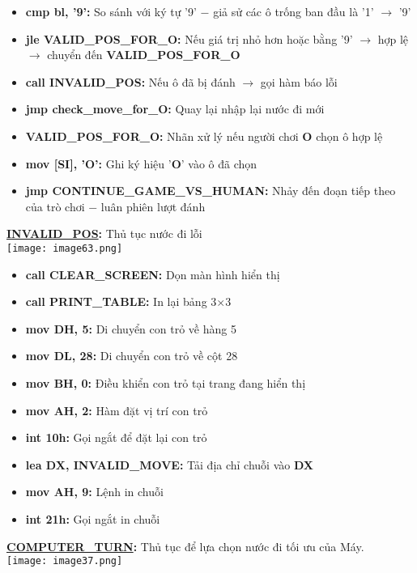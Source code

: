 \begin{itemize}
\begin{itemize}
        \item \textbf{cmp bl, '9': }So sánh với ký tự '9' $-$ giả sử các ô trống ban đầu là '1' $\rightarrow$ '9'
        \item \textbf{jle VALID\_POS\_FOR\_O:} Nếu giá trị nhỏ hơn hoặc bằng '9' $\rightarrow$ hợp lệ $\rightarrow$ chuyển đến \textbf{VALID\_POS\_FOR\_O}
        \item \textbf{call INVALID\_POS:} Nếu ô đã bị đánh $\rightarrow$ gọi hàm báo lỗi
        \item \textbf{jmp check\_move\_for\_O:} Quay lại nhập lại nước đi mới
        \item \textbf{VALID\_POS\_FOR\_O:} Nhãn xử lý nếu người chơi \textbf{O} chọn ô hợp lệ
        \item \textbf{mov [SI], 'O': }Ghi ký hiệu '\textbf{O}' vào ô đã chọn
        \item \textbf{jmp CONTINUE\_GAME\_VS\_HUMAN:} Nhảy đến đoạn tiếp theo của trò chơi $-$ luân phiên lượt đánh
    \end{itemize} 
\end{itemize}
\newpage
\textbf{\underline{INVALID\_POS}: }Thủ tục nước đi lỗi\\
\texttt{[image: image63.png]}

\begin{itemize}
    \item \textbf{call CLEAR\_SCREEN:} Dọn màn hình hiển thị
    \item \textbf{call PRINT\_TABLE:} In lại bảng 3$\times$3
    \item \textbf{mov DH, 5:} Di chuyển con trỏ về hàng 5
    \item \textbf{mov DL,  28:} Di chuyển con trỏ về cột 28
    \item \textbf{mov BH, 0: }Điều khiển con trỏ tại trang đang hiển thị 
    \item \textbf{mov AH, 2:} Hàm đặt vị trí con trỏ
    \item \textbf{int 10h:} Gọi ngắt để đặt lại con trỏ
    \item \textbf{lea DX, INVALID\_MOVE:} Tải địa chỉ chuỗi vào \textbf{DX}
    \item \textbf{mov AH, 9:} Lệnh in chuỗi
    \item \textbf{int 21h:} Gọi ngắt in chuỗi
\end{itemize}

\newpage
\textbf{\underline{COMPUTER\_TURN}: }Thủ tục để lựa chọn nước đi tối ưu của Máy.\\
\texttt{[image: image37.png]}

